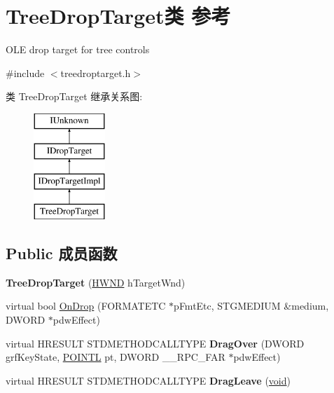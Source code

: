 \hypertarget{class_tree_drop_target}{}\section{Tree\+Drop\+Target类 参考}
\label{class_tree_drop_target}


O\+LE drop target for tree controls  




{\ttfamily \#include $<$treedroptarget.\+h$>$}

类 Tree\+Drop\+Target 继承关系图\+:\begin{figure}[H]
\begin{center}
\leavevmode
\includegraphics[height=4.000000cm]{class_tree_drop_target}
\end{center}
\end{figure}
\subsection*{Public 成员函数}
\begin{DoxyCompactItemize}
\item 
\mbox{\label{class_tree_drop_target_a0d64c0a1950953c6d06ad182bcc3ebb0}} 
{\bfseries Tree\+Drop\+Target} (\hyperlink{interfacevoid}{H\+W\+ND} h\+Target\+Wnd)
\item 
virtual bool \hyperlink{class_tree_drop_target_a068695082ff9d2081042b792205b538a}{On\+Drop} (F\+O\+R\+M\+A\+T\+E\+TC $\ast$p\+Fmt\+Etc, S\+T\+G\+M\+E\+D\+I\+UM \&medium, D\+W\+O\+RD $\ast$pdw\+Effect)
\item 
\mbox{\label{class_tree_drop_target_a7ecca52d390823cb6c5f0b2194636743}} 
virtual H\+R\+E\+S\+U\+LT S\+T\+D\+M\+E\+T\+H\+O\+D\+C\+A\+L\+L\+T\+Y\+PE {\bfseries Drag\+Over} (D\+W\+O\+RD grf\+Key\+State, \hyperlink{struct___p_o_i_n_t_l}{P\+O\+I\+N\+TL} pt, D\+W\+O\+RD \+\_\+\+\_\+\+R\+P\+C\+\_\+\+F\+AR $\ast$pdw\+Effect)
\item 
\mbox{\label{class_tree_drop_target_a0cd195c00475ecc48cd3522642db2843}} 
virtual H\+R\+E\+S\+U\+LT S\+T\+D\+M\+E\+T\+H\+O\+D\+C\+A\+L\+L\+T\+Y\+PE {\bfseries Drag\+Leave} (\hyperlink{interfacevoid}{void})
\end{DoxyCompactItemize}
